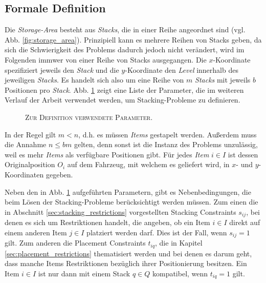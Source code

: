 \subsection{Formale Definition}
\label{sec:formal_definition}

Die \textit{Storage-Area} besteht aus \textit{Stacks}, die in einer Reihe angeordnet sind (vgl. Abb. \ref{fig:storage_area}).
Prinzipiell kann es mehrere Reihen von Stacks geben, da sich die Schwierigkeit des Problems dadurch jedoch nicht verändert,
wird im Folgenden immwer von einer Reihe von Stacks ausgegangen.
Die $x$-Koordinate spezifiziert jeweils den \textit{Stack} und die $y$-Koordinate den \textit{Level} innerhalb des jeweiligen \textit{Stacks}. Es handelt sich also um eine Reihe von $m$ \textit{Stacks} mit jeweils $b$ Positionen pro \textit{Stack}. Abb. \ref{fig:parameters} zeigt eine Liste der
Parameter, die im weiteren Verlauf der Arbeit verwendet werden, um Stacking-Probleme zu definieren.
\begin{figure}[H]
\centering
{}
\caption{\textsc{Zur Definition verwendete Parameter}.}
\label{fig:parameters}
\end{figure}
In der Regel gilt $m < n$, d.h. es müssen \textit{Items} gestapelt werden.
Außerdem muss die Annahme $n \leq bm$ gelten, denn sonst ist die Instanz des Problems unzulässig,
weil es mehr \textit{Items} als verfügbare Positionen gibt.\newline
Für jedes \textit{Item} $i \in I$ ist dessen Originalposition $O_i$ auf dem Fahrzeug, mit welchem es geliefert wird,
in $x$- und $y$-Koordinaten gegeben.

Neben den in Abb. \ref{fig:parameters} aufgeführten Parametern, gibt es Nebenbedingungen, die beim Lösen der Stacking-Probleme
berücksichtigt werden müssen. Zum einen die in Abschnitt \ref{sec:stacking_restrictions} vorgestellten Stacking Constraints $s_{ij}$,
bei denen es sich um Restriktionen handelt, die angeben, ob ein Item $i \in I$ direkt auf einem anderen Item $j \in I$ platziert werden darf.
Dies ist der Fall, wenn $s_{ij} = 1$ gilt.
Zum anderen die Placement Constraints $t_{iq}$, die in Kapitel \ref{sec:placement_restrictions} thematisiert werden und bei denen
es darum geht, dass manche Items Restriktionen bezüglich ihrer Positionierung besitzen. Ein Item $i \in I$ ist nur dann mit einem Stack
$q \in Q$ kompatibel, wenn $t_{iq} = 1$ gilt.

